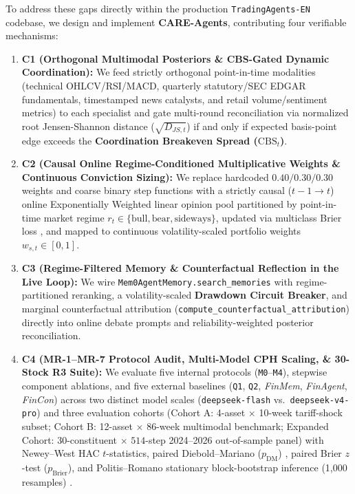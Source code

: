 \documentclass[10pt,a4paper,twocolumn]{article}
\begin{document}
To address these gaps directly within the production \texttt{TradingAgents-EN} codebase, we design and implement \textbf{CARE-Agents}, contributing four verifiable mechanisms:
\begin{enumerate}
  \setlength{\itemsep}{1pt}\setlength{\parskip}{0pt}
  \item \textbf{C1 (Orthogonal Multimodal Posteriors \& CBS-Gated Dynamic Coordination):} We feed strictly orthogonal point-in-time modalities (technical OHLCV/RSI/MACD, quarterly statutory/SEC EDGAR fundamentals, timestamped news catalysts, and retail volume/sentiment metrics) to each specialist and gate multi-round reconciliation via normalized root Jensen-Shannon distance ($\sqrt{D_{JS,t}}$) if and only if expected basis-point edge exceeds the \textbf{Coordination Breakeven Spread ($\text{CBS}_t$)}.
  \item \textbf{C2 (Causal Online Regime-Conditioned Multiplicative Weights \& Continuous Conviction Sizing):} We replace hardcoded $0.40/0.30/0.30$ weights and coarse binary step functions with a strictly causal ($t-1 \to t$) online Exponentially Weighted linear opinion pool partitioned by point-in-time market regime $r_t \in \{\text{bull}, \text{bear}, \text{sideways}\}$, updated via multiclass Brier loss \cite{brier1950verification,cesa2006prediction}, and mapped to continuous volatility-scaled portfolio weights $w_{s,t} \in [0, 1]$.
  \item \textbf{C3 (Regime-Filtered Memory \& Counterfactual Reflection in the Live Loop):} We wire \texttt{Mem0AgentMemory.search\_memories} with regime-partitioned reranking, a volatility-scaled \textbf{Drawdown Circuit Breaker}, and marginal counterfactual attribution (\texttt{compute\_counterfactual\_attribution}) directly into online debate prompts and reliability-weighted posterior reconciliation.
  \item \textbf{C4 (MR-1--MR-7 Protocol Audit, Multi-Model CPH Scaling, \& 30-Stock R3 Suite):} We evaluate five internal protocols (\texttt{M0}--\texttt{M4}), stepwise component ablations, and five external baselines (\texttt{Q1}, \texttt{Q2}, \textit{FinMem}, \textit{FinAgent}, \textit{FinCon}) across two distinct model scales (\texttt{deepseek-flash} vs.\ \texttt{deepseek-v4-pro}) and three evaluation cohorts (Cohort A: 4-asset $\times$ 10-week tariff-shock subset; Cohort B: 12-asset $\times$ 86-week multimodal benchmark; Expanded Cohort: 30-constituent $\times$ $514$-step 2024--2026 out-of-sample panel) with Newey--West HAC $t$-statistics, paired Diebold--Mariano ($p_{\text{DM}}$) \cite{diebold1995comparing}, paired Brier $z$-test ($p_{\text{Brier}}$), and Politis--Romano stationary block-bootstrap inference (1,000 resamples) \cite{politis1994stationary}.
\end{enumerate}
\end{document}
